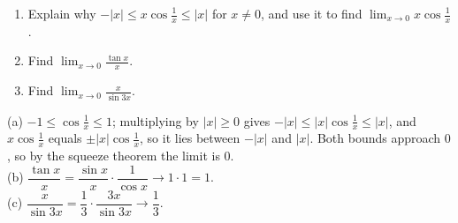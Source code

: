 \begin{exo}{}
\begin{enumerate}[label=(\alph*)]
\item Explain why $-|x|\le x\cos\frac1x\le|x|$ for $x\neq0$, and use it to find $\displaystyle\lim_{x\to0}x\cos\frac1x$.
\item Find $\displaystyle\lim_{x\to0}\frac{\tan x}{x}$.
\item Find $\displaystyle\lim_{x\to0}\frac{x}{\sin3x}$.
\end{enumerate}
\begin{solution}
(a) $-1\le\cos\frac1x\le1$; multiplying by $|x|\ge0$ gives $-|x|\le|x|\cos\frac1x\le|x|$, and $x\cos\frac1x$ equals $\pm|x|\cos\frac1x$, so it lies between $-|x|$ and $|x|$. Both bounds approach $0$, so by the squeeze theorem the limit is $0$.\\
(b) $\dfrac{\tan x}{x}=\dfrac{\sin x}{x}\cdot\dfrac{1}{\cos x}\to1\cdot1=1$.\\
(c) $\dfrac{x}{\sin3x}=\dfrac13\cdot\dfrac{3x}{\sin3x}\to\dfrac13$.
\end{solution}
\end{exo}

